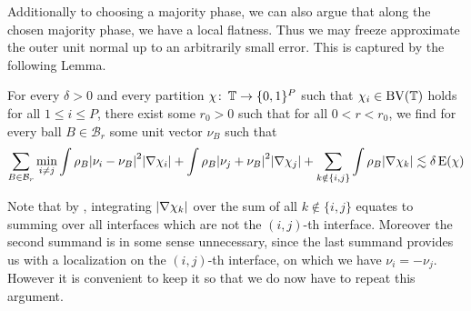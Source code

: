 Additionally to choosing a majority phase, we can also argue that along the chosen majority phase, we have a local flatness. Thus we may freeze approximate the outer unit normal up to an arbitrarily small error. This is captured by the following Lemma.

\begin{lemma}
	\label{localization_lemma_with_normals}
	For every $ \delta > 0 $ and every partition $ \chi \colon \operatorname{\mathbb{T}} \to \{ 0 , 1 \}^{ P } $ such that $ \chi_{ i } \in \operatorname{BV} ( \operatorname{\mathbb{T}} ) $ holds for all $ 1 \leq i \leq P $, there exist some $ r_{ 0 } > 0 $ such that for all $ 0 < r < r_{ 0 } $, we find for every ball $ B \in \mathcal{B}_{ r } $ some unit vector $ \nu_{ B } $ such that
	\begin{equation*}
		\sum_{ B \in \mathcal{B}_{ r } }
			\min_{ i \neq j }
				\int
					\rho_{ B }
					\abs{ \nu_{ i } - \nu_{ B } }^{ 2 }
				\abs{ \nabla \chi_{ i } }
				+
				\int
					\rho_{ B }
					\abs{ \nu_{ j } + \nu_{ B } }^{ 2 }
				\abs{ \nabla \chi_{ j } }
				+
				\sum_{ k \notin \{ i , j \} }
					\int 
						\rho_{ B }
					\abs{ \nabla \chi_{ k } }
		\lesssim
		\delta \operatorname{E} ( \chi )
	\end{equation*}
\end{lemma}
	
Note that by , integrating  $ \abs{ \nabla \chi_{ k } } $ over the sum of all $ k \notin \{ i , j \} $ equates to summing over all interfaces which are not the $ (i,j)$-th interface. Moreover the second summand is in some sense unnecessary, since the last summand provides us with a localization on the $ (i,j)$-th interface, on which we have $ \nu_{ i } = - \nu_{ j } $.
However it is convenient to keep it so that we do now have to repeat this argument.

